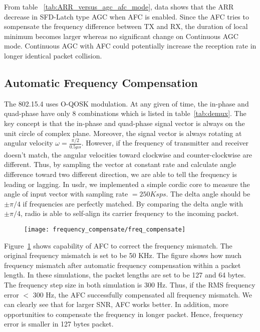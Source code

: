 From table ~\ref{tab:ARR_versus_agc_afc_mode}, data shows that the ARR decrease
in SFD-Latch type AGC when AFC is enabled. Since the AFC tries to sompensate the
frequency difference between TX and RX, the duration of local minimum becomes
larger whereas no significant change on Continuous AGC mode. Continuous AGC with
AFC could potentially increase the reception rate in longer identical packet 
collision.

\subsection{Automatic Frequency Compensation}
The 802.15.4 uses O-QOSK modulation. At any given of time, the in-phase and quad-phase
have only 8 combinations which is listed in table~\ref{tab:demux}. The key concept 
is that the in-phase and quad-phase signal vector is always on the unit circle of 
complex plane. Moreover, the signal vector is always rotating at angular velocity
$\omega = \tfrac{\pi/2}{0.5 \mu s}$. However, if the frequency of transmitter
and receiver doesn't match, the angular velocities toward clockwise and counter-clockwise
are different. Thus, by sampling the vector at constant rate and calculate angle difference
toward two different direction, we are able to tell the frequency is leading or lagging.
In usdr, we implemented a simple cordic core to measure the angle of input vector with
sampling rate $= 250 Ksps$. The delta angle should be $\pm\pi/4$ if frequencies are perfectly
matched. By comparing the delta angle with $\pm\pi/4$, radio is able to self-align
its carrier frequency to the incoming packet.
\begin{figure}[h]
\centering
	\texttt{[image: frequency\_compensate/freq\_compensate]}
	\caption{}
	\label{fig:afc_freq_error}
\end{figure}

Figure~\ref{fig:afc_freq_error} shows capability of AFC to correct the frequency 
mismatch. The original frequency mismatch is set to be 50 KHz. The figure shows how
much frequency mismatch after automatic frequency compensation within a packet length.
In these simulations, the packet lengths are set to be 127 and 64 bytes. The frequency  
step size in both simulation is 300 Hz. Thus, if the RMS frequency error $<$ 300 Hz, 
the AFC successfully compensated all frequency mismatch. We can clearly see that 
for larger SNR, AFC works better. In addition, more opportunities to compensate the
frequency in longer packet. Hence, frequency error is smaller in 127 bytes packet.


